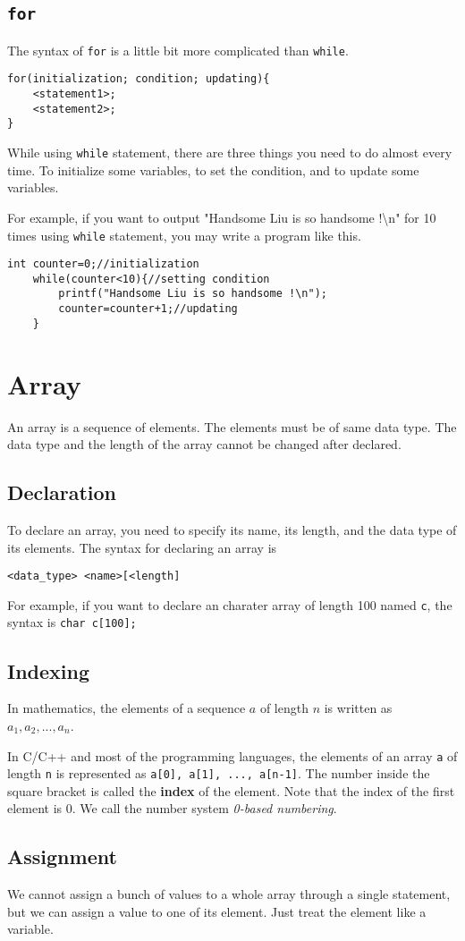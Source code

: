 \documentclass{report}
\newcommand{\bs}{\textbackslash}
\begin{document}
    \subsection{\texttt{for}}
    The syntax of \texttt{for} is a little bit more complicated than \texttt{while}.
    \begin{lstlisting}[xleftmargin=.4\textwidth]
for(initialization; condition; updating){
    <statement1>;
    <statement2>;
}
    \end{lstlisting}
    While using \texttt{while} statement, there are three things you need to do almost every time. To initialize some variables, to set the condition, and to update some variables.

    For example, if you want to output "Handsome Liu is so handsome !\bs n" for 10 times using \texttt{while} statement, you may write a program like this.
\begin{lstlisting}[style=CStyle]
    int counter=0;//initialization
    while(counter<10){//setting condition
        printf("Handsome Liu is so handsome !\n");
        counter=counter+1;//updating
    }
\end{lstlisting}

\section{Array}
    An array is a sequence of elements. The elements must be of same data type. The data type and the length of the array cannot be changed after declared.

    \subsection{Declaration}
    To declare an array, you need to specify its name, its length, and the data type of its elements. The syntax for declaring an array is
    \begin{center}\texttt{<data\_type> <name>[<length]}\end{center}
    For example, if you want to declare an charater array of length 100 named \texttt{c}, the syntax is \texttt{char c[100];}
    \subsection{Indexing}
    In mathematics, the elements of a sequence $a$ of length $n$ is written as $a_1, a_2, ..., a_n$.

    In C/C++ and most of the programming languages, the elements of an array \texttt{a} of length \texttt{n} is represented as \texttt{a[0], a[1], ..., a[n-1]}. The number inside the square bracket is called the \textbf{index} of the element. Note that the index of the first element is 0. We call the number system \textit{0-based numbering}.

    \subsection{Assignment}
    We cannot assign a bunch of values to a whole array through a single statement, but we can assign a value to one of its element. Just treat the element like a variable.
\end{document}
